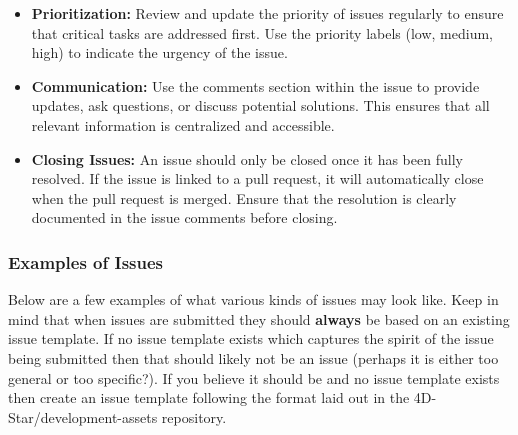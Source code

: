 \documentclass{ol-softwaremanual}
\begin{document}
\begin{itemize}
\item \textbf{Prioritization:} Review and update the priority of issues regularly to ensure that critical tasks are addressed first. Use the priority labels (low, medium, high) to indicate the urgency of the issue.
\item \textbf{Communication:} Use the comments section within the issue to provide updates, ask questions, or discuss potential solutions. This ensures that all relevant information is centralized and accessible.
\item \textbf{Closing Issues:} An issue should only be closed once it has been fully resolved. If the issue is linked to a pull request, it will automatically close when the pull request is merged. Ensure that the resolution is clearly documented in the issue comments before closing.
\end{itemize}

\subsubsection{Examples of Issues}
Below are a few examples of what various kinds of issues may look like. Keep in mind that when issues are submitted they should \textbf{always} be based on an existing issue template. If no issue template exists which captures the spirit of the issue being submitted then that should likely not be an issue (perhaps it is either too general or too specific?). If you believe it should be and no issue template exists then create an issue template following the format laid out in the 4D-Star/development-assets repository.
\end{document}
